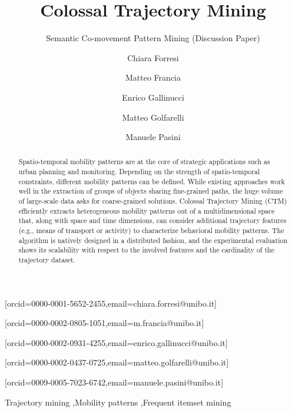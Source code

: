 \documentclass[
]{ceurart}
\begin{document}
\sloppy
{}
\title{Colossal Trajectory Mining}
\subtitle{Semantic Co-movement Pattern Mining (Discussion Paper)}
\author[1]{Chiara Forresi}[orcid=0000-0001-5652-2455,email=chiara.forresi@unibo.it]
\address[1]{DISI --- University of Bologna, Cesena, Italy}
\author[1]{Matteo Francia}[orcid=0000-0002-0805-1051,email=m.francia@unibo.it]
\cormark[1]%
\author[1]{Enrico Gallinucci}[orcid=0000-0002-0931-4255,email=enrico.gallinucci@unibo.it]
\author[1]{Matteo Golfarelli}[orcid=0000-0002-0437-0725,email=matteo.golfarelli@unibo.it]
\author[1]{Manuele Pasini}[orcid=0009-0005-7023-6742,email=manuele.pasini@unibo.it]

\begin{abstract}
Spatio-temporal mobility patterns are at the core of strategic applications such as urban planning and monitoring.
Depending on the strength of spatio-temporal constraints, different mobility patterns can be defined. 
While existing approaches work well in the extraction of groups of objects sharing fine-grained paths, the huge volume of large-scale data asks for coarse-grained solutions.
Colossal Trajectory Mining (CTM) efficiently extracts heterogeneous mobility patterns out of a multidimensional space that, along with space and time dimensions, can consider additional trajectory features (e.g., means of transport or activity) to characterize behavioral mobility patterns. 
The algorithm is natively designed in a distributed fashion, and the experimental evaluation shows its scalability with respect to the involved features and the cardinality of the trajectory dataset.
\end{abstract}

\begin{keywords}
Trajectory mining \sep Mobility patterns \sep Frequent itemset mining
\end{keywords}

\maketitle
\end{document}
